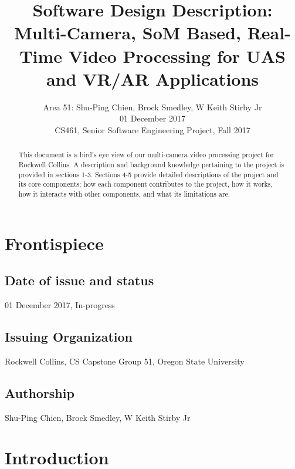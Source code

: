 \documentclass[letterpaper,10pt,serif,draftclsnofoot,onecolumn,compsoc,titlepage]{IEEEtran}
\title{Software Design Description: Multi-Camera, SoM Based, Real-Time Video Processing for UAS and VR/AR Applications}
\author{Area 51: Shu-Ping Chien, Brock Smedley, W Keith Stirby Jr \\ 01 December 2017 \\ CS461, Senior Software Engineering Project, Fall 2017}
\begin{document}
\begin{titlepage}
\maketitle

\begin{abstract}
This document is a bird's eye view of our multi-camera video processing project for Rockwell Collins. A description and background knowledge pertaining to the project is provided in sections 1-3. Sections 4-5 provide detailed descriptions of the project and its core components; how each component contributes to the project, how it works, how it interacts with other components, and what its limitations are. 

\thispagestyle{empty}
\end{abstract}
\end{titlepage}


\newpage

\section{Frontispiece}

\subsection{Date of issue and status}

01 December 2017, In-progress \\

\subsection{Issuing Organization}

Rockwell Collins, CS Capstone Group 51, Oregon State University \\

\subsection{Authorship}

Shu-Ping Chien, Brock Smedley, W Keith Stirby Jr \\

\section{Introduction}
\end{document}
